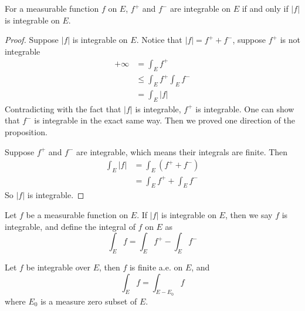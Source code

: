 \documentclass[lang=en, 12pt]{elegantbook}
\begin{document}
            \begin{proposition}
                 For a measurable function $f$ on $E$, $f^+$ and $f^-$ are integrable on $E$ if and only if $|f|$ is integrable on $E$. 
            \end{proposition}
            \begin{proof}
                Suppose $|f|$ is integrable on $E$. Notice that $|f|= f^+ + f^-$, suppose $f^+$ is not integrable 
                \begin{equation*}
                    \begin{aligned}
                        +\infty &= \int_E f^+ \\
                        &\leq \int_E f^+ \int_E f^-\\
                        &= \int_E |f|
                    \end{aligned}
                \end{equation*} 
            Contradicting with the fact that $|f|$ is integrable, $f^+$ is integrable. One can show that $f^-$ is integrable in the exact
            same way. Then we proved one direction of the proposition.\par
                Suppose $f^+$ and $f^-$ are integrable, which means their integrals are finite. Then 
                \begin{equation*}
                    \begin{aligned}
                        \int_E |f| &= \int_E (f^+ +f^-)\\ 
                        &= \int_E f^+ + \int_E f^-
                    \end{aligned}
                \end{equation*}
            So $|f|$ is integrable.
            \end{proof}
        \begin{definition}
            Let $f$ be a measurable function on $E$. If $|f|$ is integrable on $E$, then we say $f$ is integrable, and define the integral of $f$ on $E$ as 
            \begin{equation}
                \int_E f = \int_E f^+ - \int_E f^-
            \end{equation}
        \end{definition}
        \begin{proposition}
            Let $f$ be integrable over $E$, then $f$ is finite a.e. on $E$, and 
            \begin{equation}\label{GLIMeasureZeroSet}
                \int_E f = \int_{E-E_0} f
            \end{equation} 
            where $E_0$ is a measure zero subset of $E$.
        \end{proposition}
\end{document}
